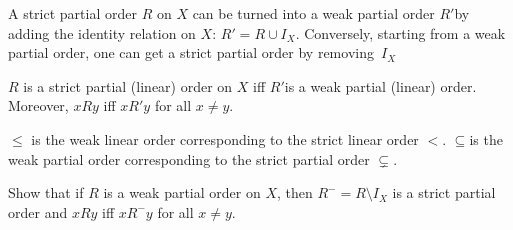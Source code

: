 \documentclass[../../include/open-logic-section]{subfiles}
\begin{document}
A strict partial order $R$ on $X$ can be turned into a weak partial
order $R'$by adding the identity relation on $X$: $R'=R\cup I_{X}$.
Conversely, starting from a weak partial order, one can get a strict
partial order by removing~$I_{X}$

\begin{prop}
$R$ is a strict partial (linear) order on $X$ iff $R'$is a weak
  partial (linear) order. Moreover, $xRy$ iff $xR'y$ for all $x\neq
  y$.
\end{prop}

\begin{ex}
$\le$ is the weak linear order corresponding to the strict linear
  order $<$. $\subseteq$is the weak partial order corresponding to the
  strict partial order $\subsetneq$.
\end{ex}

\begin{prob}
Show that if $R$ is a weak partial order on $X$, then
$R^{-}=R\setminus I_{X}$ is a strict partial order and $xRy$ iff
$xR^{-}y$ for all $x\neq y$.
\end{prob}
\end{document}
